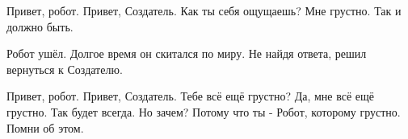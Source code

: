 \begin{dialog}
\X Привет, робот.
\R Привет, Создатель.
\X Как ты себя ощущаешь?
\R Мне грустно.
\X Так и должно быть.
\end{dialog}

\begin{monolog}
Робот ушёл. Долгое время он скитался по миру. Не найдя ответа, решил вернуться к Создателю.
\end{monolog}
	
\begin{dialog}
\X Привет, робот.
\R Привет, Создатель.
\X Тебе всё ещё грустно?
\R Да, мне всё ещё грустно.
\X Так будет всегда.
\R Но зачем?
\X Потому что ты - Робот, которому грустно. Помни об этом.
\end{dialog}